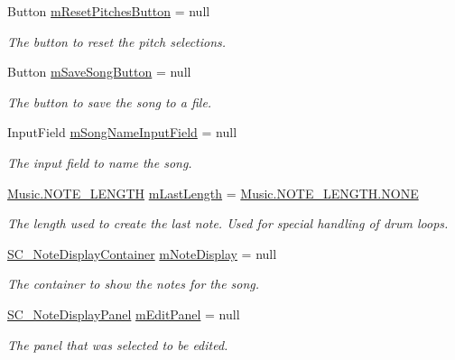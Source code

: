 \begin{DoxyCompactItemize}
Button \hyperlink{group___s_c_m_priv_var_ga7f15c9af246da41fe9f7aafb16744214}{m\+Reset\+Pitches\+Button} = null
\begin{DoxyCompactList}\small\item\em The button to reset the pitch selections. \end{DoxyCompactList}\item 
Button \hyperlink{group___s_c_m_priv_var_gaf43eabc869ead30d8ac7027e07502289}{m\+Save\+Song\+Button} = null
\begin{DoxyCompactList}\small\item\em The button to save the song to a file. \end{DoxyCompactList}\item 
Input\+Field \hyperlink{group___s_c_m_priv_var_ga0dd175c73748d5cc8ba4621f36126255}{m\+Song\+Name\+Input\+Field} = null
\begin{DoxyCompactList}\small\item\em The input field to name the song. \end{DoxyCompactList}\item 
\hyperlink{group___music_enums_gaf11b5f079adbb21c800b9eca1c5c3cbd}{Music.\+N\+O\+T\+E\+\_\+\+L\+E\+N\+G\+TH} \hyperlink{group___s_c_m_priv_var_gaa137adb1c99e9ee59adcfbf7d0cf6249}{m\+Last\+Length} = \hyperlink{group___music_enums_ggaf11b5f079adbb21c800b9eca1c5c3cbdab50339a10e1de285ac99d4c3990b8693}{Music.\+N\+O\+T\+E\+\_\+\+L\+E\+N\+G\+T\+H.\+N\+O\+NE}
\begin{DoxyCompactList}\small\item\em The length used to create the last note. Used for special handling of drum loops. \end{DoxyCompactList}\item 
\hyperlink{class_s_c___note_display_container}{S\+C\+\_\+\+Note\+Display\+Container} \hyperlink{group___s_c_m_priv_var_ga308f19d1b2020fc625c12dd08ee16b1c}{m\+Note\+Display} = null
\begin{DoxyCompactList}\small\item\em The container to show the notes for the song. \end{DoxyCompactList}\item 
\hyperlink{class_s_c___note_display_panel}{S\+C\+\_\+\+Note\+Display\+Panel} \hyperlink{group___s_c_m_priv_var_gad063b650cf7112be19edaf1a2033ea4d}{m\+Edit\+Panel} = null
\begin{DoxyCompactList}\small\item\em The panel that was selected to be edited. \end{DoxyCompactList}\item 

\end{DoxyCompactItemize}
